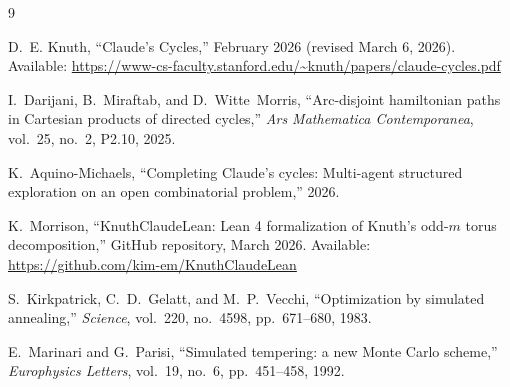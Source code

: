 \documentclass[11pt]{article}
\theoremstyle{plain}
\begin{document}
\begin{thebibliography}{9}

D.~E. Knuth, ``Claude's Cycles,'' February 2026 (revised March 6, 2026).
Available: \url{https://www-cs-faculty.stanford.edu/~knuth/papers/claude-cycles.pdf}

I.~Darijani, B.~Miraftab, and D.~Witte~Morris, ``Arc-disjoint hamiltonian
paths in Cartesian products of directed cycles,'' \emph{Ars Mathematica
Contemporanea}, vol.~25, no.~2, P2.10, 2025.

K.~Aquino-Michaels, ``Completing Claude's cycles: Multi-agent structured
exploration on an open combinatorial problem,'' 2026.

K.~Morrison, ``KnuthClaudeLean: Lean 4 formalization of Knuth's odd-$m$
torus decomposition,'' GitHub repository, March 2026.
Available: \url{https://github.com/kim-em/KnuthClaudeLean}

S.~Kirkpatrick, C.~D.~Gelatt, and M.~P.~Vecchi, ``Optimization by simulated
annealing,'' \emph{Science}, vol.~220, no.~4598, pp.~671--680, 1983.

E.~Marinari and G.~Parisi, ``Simulated tempering: a new Monte Carlo scheme,''
\emph{Europhysics Letters}, vol.~19, no.~6, pp.~451--458, 1992.

\end{thebibliography}
\end{document}
